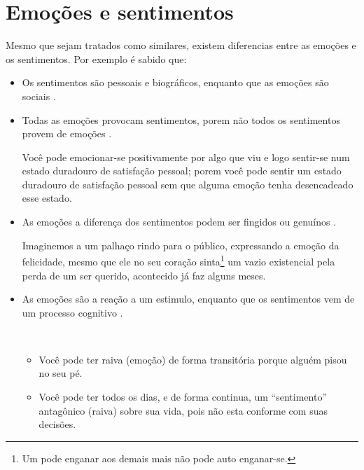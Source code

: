\newpage

\section{Emoções e sentimentos}
\label{ref:emotionsentimental}
Mesmo que sejam tratados como similares, 
existem diferencias entre as emoções e os sentimentos.
Por exemplo é sabido que:
\begin{itemize}
%
\item Os sentimentos são pessoais e biográficos, enquanto que as emoções são sociais \cite[pp. 42]{hofman2015affective}.
%
\item Todas as emoções provocam sentimentos, porem não todos os sentimentos provem de emoções
\cite[pp. 288]{zanelli2014psicologia} \cite{freitas2015codigo}.
\begin{example}
Você pode emocionar-se positivamente por algo que viu e logo sentir-se num estado duradouro de satisfação pessoal;
porem você pode sentir um estado duradouro de satisfação pessoal sem que alguma emoção tenha desencadeado esse estado.
\end{example}
%
\item As emoções a diferença dos sentimentos podem ser fingidos ou genuínos \cite[pp. 32]{nicolas2018musicas}.
\begin{example}[Ri palhaço\, ri:]
Imaginemos a um palhaço rindo para o público, expressando a emoção da felicidade,
mesmo que ele no seu coração sinta\footnote{Um pode enganar aos demais mais não pode auto enganar-se.} 
um vazio existencial pela perda de um ser querido,
acontecido já faz alguns meses.
\end{example}
\item As emoções são a reação a um estimulo, enquanto que os sentimentos vem de um processo cognitivo \cite{freitas2013psicologia}.
\begin{example} ~

\begin{itemize}
\item Você pode ter raiva (emoção) de forma transitória porque alguém pisou no seu pé.
\item Você pode ter todos os dias, e de forma continua, um ``sentimento'' antagônico (raiva) sobre sua vida, 
pois não esta conforme com suas decisões.
\end{itemize}
\end{example}
\end{itemize}

